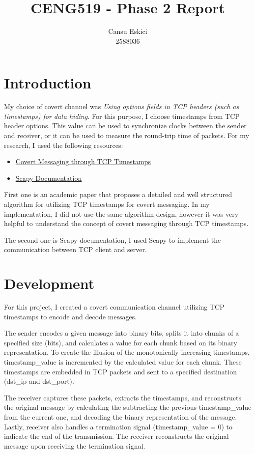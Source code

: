 \documentclass[10pt,a4paper]{article}
\title{CENG519 - Phase 2 Report}
\author{
  Cansu Eskici\\
  2588036}
\begin{document}
\maketitle
\section*{Introduction}
My choice of covert channel was \textit{Using options fields in TCP headers (such as timestamps) for data hiding.} 
For this purpose, I choose timestamps from TCP header options. 
This value can be used to synchronize clocks between the sender and receiver, or it can be used to measure the round-trip time of packets.
For my research, I used the following resources:
\begin{itemize}
    \item \href{https://web.mit.edu/greenie/Public/petspaper.pdf}{Covert Messaging through TCP Timestamps}
    \item \href{https://scapy.readthedocs.io/en/latest/}{Scapy Documentation}
\end{itemize}

First one is an academic paper that proposes a detailed and well structured algorithm for utilizing TCP timestamps for covert messaging. In my implementation, I did not use the same algorithm design, however it was very helpful to understand the concept of covert messaging through TCP timestamps.

The second one is Scapy documentation, I used Scapy to implement the communication between TCP client and server. 

\section*{Development}

For this project, I created a covert communication channel utilizing TCP timestamps to encode and decode messages.

The sender encodes a given message into binary bits, splits it into chunks of a specified size (bits), and calculates a value for each chunk based on its binary representation.
To create the illusion of the monotonically increasing timestamps, timestamp\_value is incremented by the calculated value for each chunk.
These timestamps are embedded in TCP packets and sent to a specified destination (dst\_ip and dst\_port). 

The receiver captures these packets, extracts the timestamps, and reconstructs the original message by calculating the subtracting the previous timestamp\_value from the current one, and decoding the binary representation of the message.
Lastly, receiver also handles a termination signal (timestamp\_value = 0) to indicate the end of the transmission. The receiver reconstructs the original message upon receiving the termination signal.
\end{document}
